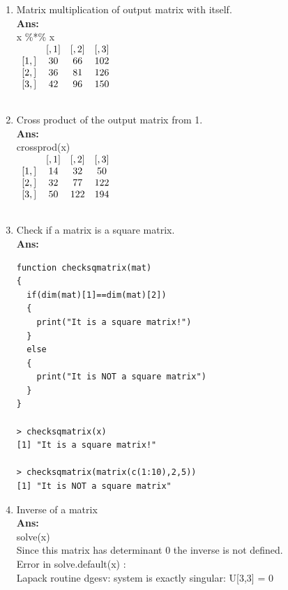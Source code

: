 \documentclass[fontsize=10pt]{scrartcl}
\begin{document}
\begin{enumerate}
\begin{enumerate}
				\item
				Matrix multiplication of output matrix with itself. \\
				\textbf{Ans:} \\
				x \%*\% x \\
				$\begin{array}{cccc}
				~		&	[,1]	&	[,2]	&	[,3]	\\ \relax
				[1,]	&	30		&	66		&	102		\\ \relax
				[2,]	&	36		&	81		&	126		\\ \relax
				[3,]	&	42		&	96		&	150		\\ \relax
				\end{array}$

				\item
				Cross product of the output matrix from 1. \\
				\textbf{Ans:} \\
				crossprod(x) \\
				$\begin{array}{cccc}
				~		&	[,1]	&	[,2]	&	[,3]	\\ \relax
				[1,]	&	14		&	32		&	50		\\ \relax
				[2,]	&	32		&	77		&	122		\\ \relax
				[3,]	&	50		&	122		&	194		\\ \relax
				\end{array}$

				\item
				Check if a matrix is a square matrix. \\
				\textbf{Ans:} \\
				\begin{verbatim}
function checksqmatrix(mat) 
{ 
  if(dim(mat)[1]==dim(mat)[2]) 
  { 
    print("It is a square matrix!") 
  } 
  else 
  { 
    print("It is NOT a square matrix") 
  } 
} 

> checksqmatrix(x)
[1] "It is a square matrix!"

> checksqmatrix(matrix(c(1:10),2,5))
[1] "It is NOT a square matrix"
\end{verbatim}
				
				\item
				Inverse of a matrix \\
				\textbf{Ans:} \\
				solve(x) \\
				Since this matrix has determinant 0 the inverse is not defined. \\
				Error in solve.default(x) :  \\
  				Lapack routine dgesv: system is exactly singular: U[3,3] = 0 \\


\end{enumerate}
\end{enumerate}
\end{document}
